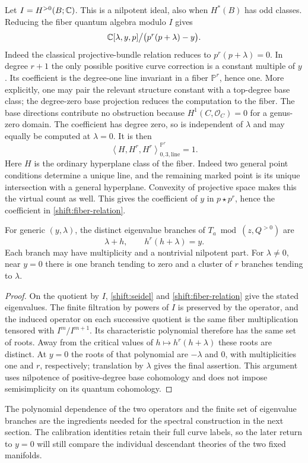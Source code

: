 Let $I=H^{>0}(B;\mathbb C)$.  This is a nilpotent ideal, also when
$H^*(B)$ has odd classes.  Reducing the fiber quantum algebra
modulo $I$ gives
\begin{equation}
 \mathbb C[\lambda,y,p]\big/\bigl(p^r(p+\lambda)-y\bigr).
 \label{shift:fiber-relation}
\end{equation}
Indeed the classical projective-bundle relation reduces to
$p^r(p+\lambda)=0$.  In degree $r+1$ the only possible positive
curve correction is a constant multiple of $y$.  Its coefficient
is the degree-one line invariant in a fiber $\mathbb P^r$, hence
one.  More explicitly, one may pair the relevant structure
constant with a top-degree base class; the degree-zero base
projection reduces the computation to the fiber.  The base
directions contribute no obstruction because
$H^1(C,\mathcal O_C)=0$ for a genus-zero domain.  The coefficient
has degree zero, so is independent of $\lambda$ and may equally
be computed at $\lambda=0$.  It is then
\[
       \left\langle H,H^r,H^r\right\rangle^{\mathbb P^r}
                      _{0,3,\mathrm{line}}=1.
\]
Here $H$ is the ordinary hyperplane class of the fiber.
Indeed two general point conditions determine a unique line, and
the remaining marked point is its unique intersection with a
general hyperplane.  Convexity of projective space makes this the
virtual count as well.  This gives the coefficient of $y$ in
$p\star p^r$, hence the coefficient in
\eqref{shift:fiber-relation}.

\begin{proposition}
\label{shift:spectrum-proposition}
For generic $(y,\lambda)$, the distinct eigenvalue branches of
$T_a\bmod(z,Q^{>0})$ are
\begin{equation}
             \lambda+h,\qquad h^r(h+\lambda)=y.
 \label{shift:spectrum}
\end{equation}
Each branch may have multiplicity and a nontrivial nilpotent part.
For $\lambda\ne0$, near $y=0$ there is one branch tending to zero
and a cluster of $r$ branches tending to $\lambda$.
\end{proposition}

\begin{proof}
On the quotient by $I$, \eqref{shift:seidel} and
\eqref{shift:fiber-relation} give the stated eigenvalues.  The
finite filtration by powers of $I$ is preserved by the operator,
and the induced operator on each successive quotient is the same
fiber multiplication tensored with $I^m/I^{m+1}$.  Its characteristic
polynomial therefore has the same set of roots.  Away from the
critical values of $h\mapsto h^r(h+\lambda)$ these roots are
distinct.  At $y=0$ the roots of that polynomial are $-\lambda$
and $0$, with multiplicities one and $r$, respectively; translation
by $\lambda$ gives the final assertion.  This argument uses
nilpotence of positive-degree base cohomology and does not impose
semisimplicity on its quantum cohomology.
\end{proof}

The polynomial dependence of the two operators and the finite set
of eigenvalue branches are the ingredients needed for the
spectral construction in the next section.  The calibration
identities retain their full curve labels, so the later return to
$y=0$ will still compare the individual descendant theories of
the two fixed manifolds.
